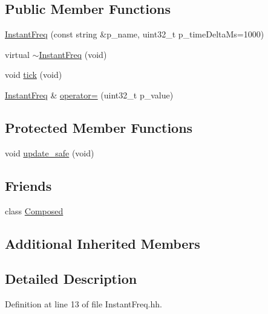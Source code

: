 \subsection*{Public Member Functions}
\begin{DoxyCompactItemize}
\item 
\hyperlink{classxtd_1_1counters_1_1InstantFreq_a428c013f73c1322ee3fc74cc08171c8c}{Instant\-Freq} (const string \&p\-\_\-name, uint32\-\_\-t p\-\_\-time\-Delta\-Ms=1000)
\item 
virtual \hyperlink{classxtd_1_1counters_1_1InstantFreq_a1a002d74711692449aec178e09606193}{$\sim$\-Instant\-Freq} (void)
\item 
void \hyperlink{classxtd_1_1counters_1_1InstantFreq_a1760f09b25b97545169be189bf99d250}{tick} (void)
\item 
\hyperlink{classxtd_1_1counters_1_1InstantFreq}{Instant\-Freq} \& \hyperlink{classxtd_1_1counters_1_1InstantFreq_a3ae7dc13ff6209a0628cdf481ab0a37c}{operator=} (uint32\-\_\-t p\-\_\-value)
\end{DoxyCompactItemize}
\subsection*{Protected Member Functions}
\begin{DoxyCompactItemize}
\item 
void \hyperlink{classxtd_1_1counters_1_1InstantFreq_a2e4629f5a835d7b52425a72f25dcd4d2}{update\-\_\-safe} (void)
\end{DoxyCompactItemize}
\subsection*{Friends}
\begin{DoxyCompactItemize}
\item 
class \hyperlink{classxtd_1_1counters_1_1InstantFreq_a93e934ad70d5b32b14beed5572450abf}{Composed}
\end{DoxyCompactItemize}
\subsection*{Additional Inherited Members}


\subsection{Detailed Description}


Definition at line 13 of file Instant\-Freq.\-hh.



